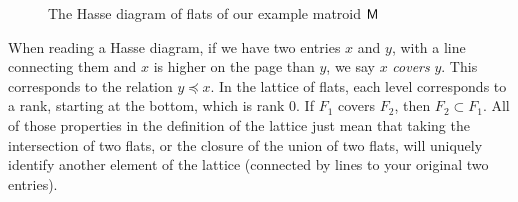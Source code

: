 \documentclass[12pt,oneside]{../../sfsuthesis}
\begin{document}
\begin{figure}[H]
    \centering
    \caption{The Hasse diagram of flats of our example matroid \( \mathsf{M} \)}
\end{figure}

When reading a Hasse diagram, if we have two entries \( x \) and \( y \), with a line connecting them and \( x \) is higher on the page than \( y \), we say \( x \) \emph{covers} \( y \).
This corresponds to the relation \( y \preceq x \).
In the lattice of flats, each level corresponds to a rank, starting at the bottom, which is rank 0.
If \( F_1 \) covers \( F_2 \), then \( F_2 \subset F_1 \).
All of those properties in the definition of the lattice just mean that taking the intersection of two flats, or the closure of the union of two flats, will uniquely identify another element of the lattice (connected by lines to your original two entries).
\end{document}
